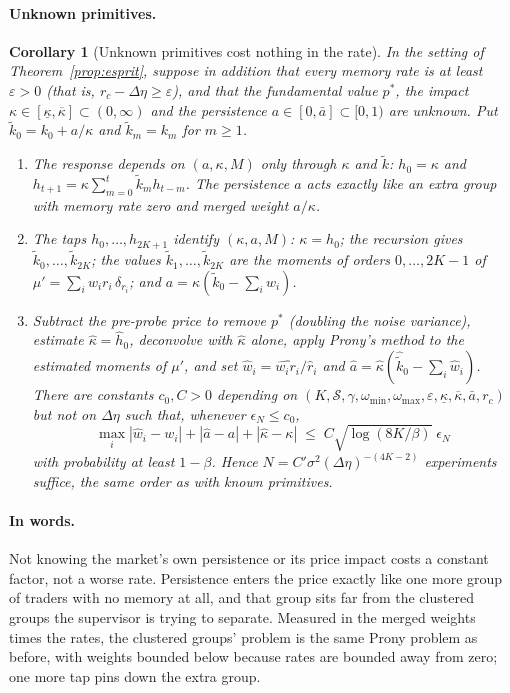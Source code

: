 \documentclass[12pt]{article}
\newtheorem{corollary}[theorem]{Corollary}
\theoremstyle{definition}
\theoremstyle{remark}
\begin{document}
\paragraph{Unknown primitives.}
\begin{corollary}[Unknown primitives cost nothing in the rate]
\label{cor:unknown_primitives}
In the setting of Theorem~\ref{prop:esprit}, suppose in addition that every memory rate is at least $\varepsilon>0$ (that is, $r_c-\Delta\eta\ge\varepsilon$), and that the fundamental value $p^*$, the impact $\kappa\in[\underline\kappa,\overline\kappa]\subset(0,\infty)$ and the persistence $a\in[0,\bar a]\subset[0,1)$ are unknown. Put $\tilde k_0=k_0+a/\kappa$ and $\tilde k_m=k_m$ for $m\ge1$.
\begin{enumerate}[label=(\roman*)]
\item The response depends on $(a,\kappa,M)$ only through $\kappa$ and $\tilde k$: $h_0=\kappa$ and $h_{t+1}=\kappa\sum_{m=0}^{t}\tilde k_mh_{t-m}$. The persistence $a$ acts exactly like an extra group with memory rate zero and merged weight $a/\kappa$.
\item The taps $h_0,\ldots,h_{2K+1}$ identify $(\kappa,a,M)$: $\kappa=h_0$; the recursion gives $\tilde k_0,\ldots,\tilde k_{2K}$; the values $\tilde k_1,\ldots,\tilde k_{2K}$ are the moments of orders $0,\ldots,2K-1$ of $\mu'=\sum_iw_ir_i\,\delta_{r_i}$; and $a=\kappa(\tilde k_0-\sum_iw_i)$.
\item Subtract the pre-probe price to remove $p^*$ (doubling the noise variance), estimate $\hat\kappa=\hat h_0$, deconvolve with $\hat\kappa$ alone, apply Prony's method to the estimated moments of $\mu'$, and set $\hat w_i=\widehat{w_ir_i}/\hat r_i$ and $\hat a=\hat\kappa(\hat{\tilde k}_0-\sum_i\hat w_i)$. There are constants $c_0,C>0$ depending on $(K,\mathcal S,\gamma,\omega_{\min},\omega_{\max},\varepsilon,\underline\kappa,\overline\kappa,\bar a,r_c)$ but not on $\Delta\eta$ such that, whenever $\epsilon_N\le c_0$,
\[
\max_i|\hat w_i-w_i|+|\hat a-a|+|\hat\kappa-\kappa|\;\le\;C\sqrt{\log(8K/\beta)}\;\epsilon_N
\]
with probability at least $1-\beta$. Hence $N=C'\sigma^2(\Delta\eta)^{-(4K-2)}$ experiments suffice, the same order as with known primitives.
\end{enumerate}
\end{corollary}

\paragraph{In words.} Not knowing the market's own persistence or its price impact costs a constant factor, not a worse rate. Persistence enters the price exactly like one more group of traders with no memory at all, and that group sits far from the clustered groups the supervisor is trying to separate. Measured in the merged weights times the rates, the clustered groups' problem is the same Prony problem as before, with weights bounded below because rates are bounded away from zero; one more tap pins down the extra group.
\end{document}

